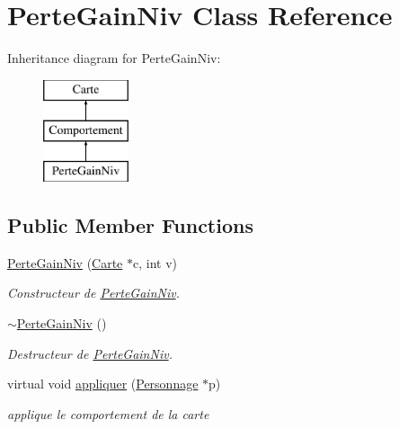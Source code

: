 \hypertarget{class_perte_gain_niv}{\section{Perte\-Gain\-Niv Class Reference}
\label{class_perte_gain_niv}
}
Inheritance diagram for Perte\-Gain\-Niv\-:\begin{figure}[H]
\begin{center}
\leavevmode
\includegraphics[height=3.000000cm]{class_perte_gain_niv}
\end{center}
\end{figure}
\subsection*{Public Member Functions}
\begin{DoxyCompactItemize}
\item 
\hyperlink{class_perte_gain_niv_a482fc9a3d23b5f0586268f9d100054d3}{Perte\-Gain\-Niv} (\hyperlink{class_carte}{Carte} $\ast$c, int v)
\begin{DoxyCompactList}\small\item\em Constructeur de \hyperlink{class_perte_gain_niv}{Perte\-Gain\-Niv}. \end{DoxyCompactList}\item 
\hypertarget{class_perte_gain_niv_a8250ecb9285f3b109570502dd0434a8c}{\hyperlink{class_perte_gain_niv_a8250ecb9285f3b109570502dd0434a8c}{$\sim$\-Perte\-Gain\-Niv} ()}\label{class_perte_gain_niv_a8250ecb9285f3b109570502dd0434a8c}

\begin{DoxyCompactList}\small\item\em Destructeur de \hyperlink{class_perte_gain_niv}{Perte\-Gain\-Niv}. \end{DoxyCompactList}\item 
virtual void \hyperlink{class_perte_gain_niv_ad72efe1c526391084768a500bb1ae4fa}{appliquer} (\hyperlink{class_personnage}{Personnage} $\ast$p)
\begin{DoxyCompactList}\small\item\em applique le comportement de la carte \end{DoxyCompactList}\end{DoxyCompactItemize}
